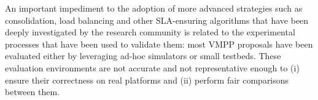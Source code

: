 An important impediment to the adoption of more advanced strategies
such as consolidation, load balancing and other SLA-ensuring
algorithms that have been deeply investigated by the research community
\cite{feller:ccgrid12, Hermenier:2009:ECM:1508293.1508300, 5715067,
  quesnel:cpe2012, 5328077, 5935254} is related to the experimental
processes that have been used to validate them: most VMPP proposals have
been evaluated either by leveraging ad-hoc simulators or small
testbeds. These evaluation environments are not accurate and not
representative enough to (i) ensure their correctness on real
platforms and (ii) perform fair comparisons between them.
%
